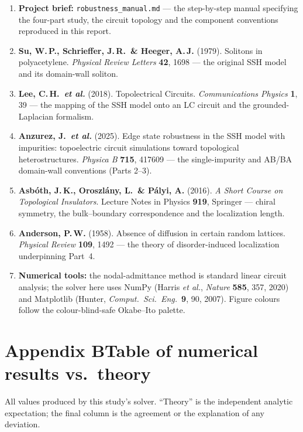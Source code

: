\documentclass[11pt]{article}
\begin{document}
\begin{enumerate}[leftmargin=1.6em,itemsep=3pt]
\item \textbf{Project brief:} \texttt{robustness\_manual.md} --- the
      step-by-step manual specifying the four-part study, the circuit
      topology and the component conventions reproduced in this report.
\item \textbf{Su, W.\,P., Schrieffer, J.\,R.\ \& Heeger, A.\,J.} (1979).
      Solitons in polyacetylene. \textit{Physical Review Letters}
      \textbf{42}, 1698 --- the original SSH model and its domain-wall
      soliton.
\item \textbf{Lee, C.\,H.\ \textit{et al.}} (2018). Topolectrical
      Circuits. \textit{Communications Physics} \textbf{1}, 39 --- the
      mapping of the SSH model onto an LC circuit and the grounded-Laplacian
      formalism.
\item \textbf{Anzurez, J.\ \textit{et al.}} (2025). Edge state robustness
      in the SSH model with impurities: topoelectric circuit simulations
      toward topological heterostructures. \textit{Physica B} \textbf{715},
      417609 --- the single-impurity and AB/BA domain-wall conventions
      (Parts 2--3).
\item \textbf{Asb\'oth, J.\,K., Oroszl\'any, L.\ \& P\'alyi, A.} (2016).
      \textit{A Short Course on Topological Insulators}. Lecture Notes in
      Physics \textbf{919}, Springer --- chiral symmetry, the bulk--boundary
      correspondence and the localization length.
\item \textbf{Anderson, P.\,W.} (1958). Absence of diffusion in certain
      random lattices. \textit{Physical Review} \textbf{109}, 1492 --- the
      theory of disorder-induced localization underpinning Part~4.
\item \textbf{Numerical tools:} the nodal-admittance method is standard
      linear circuit analysis; the solver here uses NumPy (Harris
      \textit{et al.}, \textit{Nature} \textbf{585}, 357, 2020) and
      Matplotlib (Hunter, \textit{Comput.\ Sci.\ Eng.}\ \textbf{9}, 90,
      2007). Figure colours follow the colour-blind-safe Okabe--Ito
      palette.
\end{enumerate}

\clearpage
\section*{Appendix B\quad Table of numerical results vs.\ theory}
\small
All values produced by this study's solver. ``Theory'' is the independent
analytic expectation; the final column is the agreement or the explanation
of any deviation.
\end{document}

